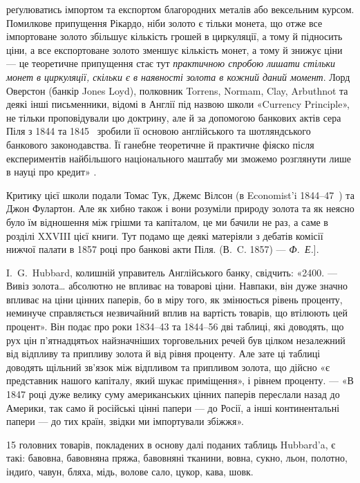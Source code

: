\parcont{}  %
реґулюватись імпортом та експортом благородних металів або вексельним курсом.
Помилкове припущення Рікардо, ніби золото є тільки монета, що отже все імпортоване
золото збільшує кількість грошей в циркуляції, а тому й підносить ціни,
а все експортоване золото зменшує кількість монет, а тому й знижує ціни —
це теоретичне припущення стає тут \emph{практичною спробою лишати стільки
монет в циркуляції, скільки є в наявності золота в кожний даний
момент}. Лорд Оверстон (банкір Jones Loyd), полковник Torrens, Normam, Clay,
Arbuthnot та деякі інші письменники, відомі в Англії під назвою школи «Currency
Principle», не тільки проповідували цю доктрину, але й за допомогою банкових
актів сера Піля з 1844 та 1845~ зробили її основою англійського та шотляндського
банкового законодавства. Її ганебне теоретичне й практичне фіяско після
експериментів найбільшого національного маштабу ми зможемо розглянути лише
в науці про кредит» .

Критику цієї школи подали Томас Тук, Джемс Вілсон (в Economist’i 1844--47~)
та Джон Фулартон. Але як хибно також і вони розуміли природу золота
та як неясно було їм відношення між грішми та капіталом, це ми бачили не
раз, а саме в розділі XXVIII цієї книги. Тут подамо ще деякі матеріяли з дебатів
комісії нижчої палати в 1857 році про банкові акти Піля. (В.~C. 1857) — \emph{Ф.~Е.}].

I.~G.~Hubbard, колишній управитель Англійського банку, свідчить: «2400. —
Вивіз золота\dots{} абсолютно не впливає на товарові ціни. Навпаки, він дуже
значно впливає на ціни цінних паперів, бо в міру того, як змінюється рівень
проценту, неминуче справляється незвичайний вплив на вартість товарів, що втілюють
цей процент». Він подає про роки 1834--43 та 1844--56 дві таблиці,
які доводять, що рух цін п’ятнадцятьох найзначніших торговельних речей був
цілком незалежний від відпливу та припливу золота й від рівня проценту. Але
зате ці таблиці доводять щільний зв’язок між відпливом та припливом золота,
що дійсно «є представник нашого капіталу, який шукає приміщення», і рівнем
проценту. — «В 1847 році дуже велику суму американських цінних паперів переслали
назад до Америки, так само й російські цінні папери — до Росії, а інші
континентальні папери — до тих країн, звідки ми імпортували збіжжя».

15 головних товарів, покладених в основу далі поданих таблиць Hubbard’a,
є такі: бавовна, бавовняна пряжа, бавовняні тканини, вовна, сукно,
льон, полотно, індиґо, чавун, бляха, мідь, волове сало, цукор, кава, шовк.

